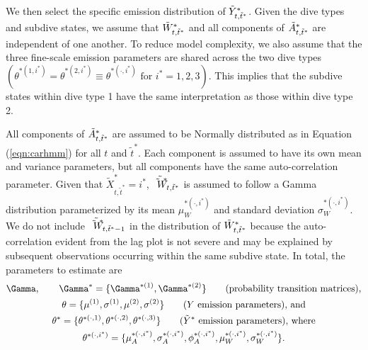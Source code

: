 We then select the specific emission distribution of $\tilde{Y}^*_{t,\tilde t^*}$. Given the dive types and subdive states, we assume that $\tilde{W}^*_{t,\tilde t^*}$ and all components of $\tilde{A}^*_{t,\tilde t^*}$ are independent of one another. To reduce model complexity, we also assume that the three fine-scale emission parameters are shared across the two dive types $\left(\theta^{*(1,i^*)} = \theta^{*(2,i^*)} \equiv \theta^{*(\cdot,i^*)} \text{ for } i^* = 1,2,3\right)$. This implies that the subdive states within dive type 1 have the same interpretation as those within dive type 2.

All components of $\tilde{A}^*_{t,\tilde t^*}$ are assumed to be Normally distributed as in Equation (\ref{eqn:carhmm}) for all $t$ and $\tilde t^*$. Each component is assumed to have its own mean and variance parameters, but all components have the same auto-correlation parameter. 
Given that $\tilde X^*_{t,\tilde t^*} = i^*$, $\tilde {\tilde{W}^*}_{t,\tilde t^*}$ is assumed to follow a Gamma distribution parameterized by its mean $\mu_W^{*(\cdot,i^*)}$ and standard deviation $\sigma_W^{*(\cdot,i^*)}$. We do not include $\tilde {\tilde{W}^*}_{t,\tilde t^*-1}$ in the distribution of $\tilde{W}^*_{t,\tilde t^*}$ because the auto-correlation evident from the lag plot is not severe and may be explained by subsequent observations occurring within the same subdive state. 
%
In total, the parameters to estimate are
%
\begin{gather*}
    \Gamma, \qquad \Gamma^{*} = \{\Gamma^{*(1)},\Gamma^{*(2)}\} \qquad \text{(probability transition matrices)}, \\
    \theta = \{\mu^{(1)},\sigma^{(1)},\mu^{(2)},\sigma^{(2)}\} \qquad \text{($Y$ emission parameters), and} \\
    \theta^* = \{\theta^{*(\cdot,1)},\theta^{*(\cdot,2)},\theta^{*(\cdot,3)}\}  \qquad \text{($\Z$ emission parameters), where} \\
    \theta^{*(\cdot,i^*)} =  \{\mu_A^{*(\cdot,i^*)},\sigma_A^{*(\cdot,i^*)},\phi_A^{*(\cdot,i^*)},\mu_W^{*(\cdot,i^*)},\sigma_W^{*(\cdot,i^*)}\}.
\end{gather*}
